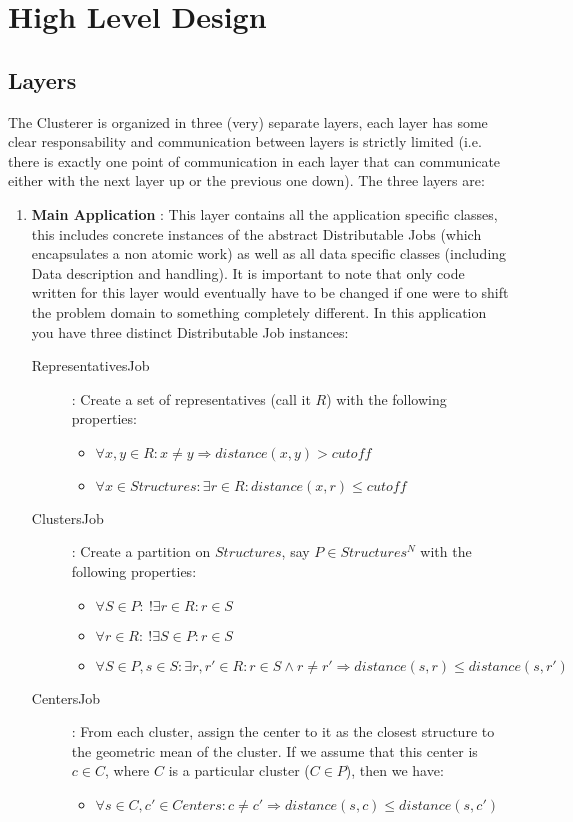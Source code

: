 \documentclass[a4paper]{article}
\begin{document}
\section{High Level Design}

\subsection{Layers}

The Clusterer is organized in three (very) separate layers, each layer has some clear responsability and communication between layers is strictly limited (i.e. there is exactly one point of communication in each layer that can communicate either with the next layer up or the previous one down). The three layers are:
\begin{enumerate}
 \item \textbf{Main Application} : This layer contains all the application specific classes, this includes concrete instances of the abstract Distributable Jobs (which encapsulates a non atomic work) as well as all data specific classes (including Data description and handling). It is important to note that only code written for this layer would eventually have to be changed if one were to shift the problem domain to something completely different. In this application you have three distinct Distributable Job instances:
\begin{description}
 \item [RepresentativesJob] : Create a set of representatives (call it $R$) with the following properties:
\begin{itemize}
 \item $\forall x,y \in R : x \neq y \Rightarrow distance(x,y) > cutoff $
 \item $\forall x \in Structures : \exists r \in R : distance(x,r) \leq cutoff $
\end{itemize}
 \item [ClustersJob] : Create a partition on $Structures$, say $P \in Structures^{N}$ with the following properties:
\begin{itemize}
 \item $\forall S \in P : \ !\exists r \in R : r \in S$
 \item $\forall r \in R : \ !\exists S \in P : r \in S$
 \item $\forall S \in P, s \in S : \exists r,r' \in R : r \in S \land r \neq r' \Rightarrow distance(s,r) \leq distance(s,r') $
\end{itemize}
 \item [CentersJob] : From each cluster, assign the center to it as the closest structure to the geometric mean of the cluster. If we assume that this center is $c \in C$, where $C$ is a particular cluster ($C \in P$), then we have:
 \begin{itemize}
 \item $\forall s \in C , c' \in Centers : c \neq c' \Rightarrow distance(s,c) \leq distance(s,c')$
\end{itemize}


\end{description}
\end{enumerate}
\end{document}
